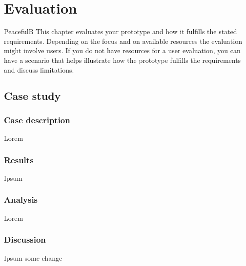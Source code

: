 \chapter{Evaluation}
PeacefulB
This chapter evaluates your prototype and how it fulfills the
stated requirements. Depending on the focus and on available resources
the evaluation might involve users. If you do not have resources for a user
evaluation, you can have a scenario that helps illustrate how the prototype
fulfills the requirements and discuss limitations.

\section{Case study}
\subsection{Case description}
Lorem
\subsection{Results}
Ipsum
\subsection{Analysis}
Lorem
\subsection{Discussion}
Ipsum some change